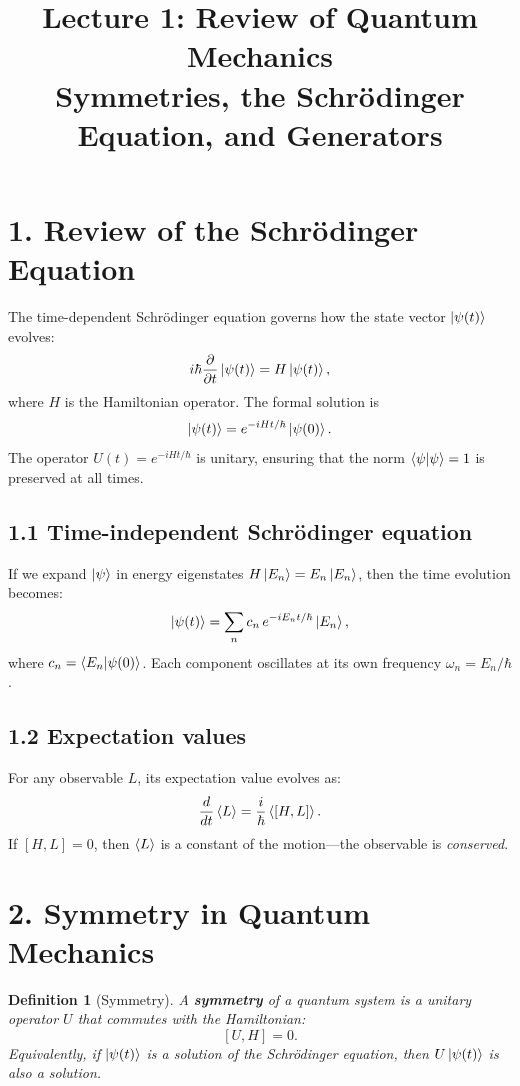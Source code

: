 \documentclass[12pt,a4paper]{article}
\title{\textbf{Lecture 1: Review of Quantum Mechanics} \\ \large Symmetries, the Schr\"odinger Equation, and Generators}
\date{}
\newtheorem{definition}{Definition}
\begin{document}
\maketitle
\thispagestyle{fancy}

\section{1. Review of the Schr\"odinger Equation}

The time-dependent Schr\"odinger equation governs how the state vector $\ket{\psi(t)}$ evolves:
\[
    i\hbar \frac{\partial}{\partial t}\ket{\psi(t)} = H \ket{\psi(t)},
\]
where $H$ is the Hamiltonian operator.  The formal solution is
\[
    \ket{\psi(t)} = e^{-iHt/\hbar}\ket{\psi(0)}.
\]
The operator $U(t) = e^{-iHt/\hbar}$ is unitary, ensuring that the norm $\braket{\psi}{\psi} = 1$ is preserved at all times.

\subsection{1.1 Time-independent Schr\"odinger equation}
If we expand $\ket{\psi}$ in energy eigenstates $H\ket{E_n} = E_n\ket{E_n}$, then the time evolution becomes:
\[
    \ket{\psi(t)} = \sum_n c_n \, e^{-iE_n t/\hbar}\ket{E_n},
\]
where $c_n = \braket{E_n}{\psi(0)}$.  Each component oscillates at its own frequency $\omega_n = E_n/\hbar$.

\subsection{1.2 Expectation values}
For any observable $L$, its expectation value evolves as:
\[
    \frac{d}{dt}\expval{L} = \frac{i}{\hbar}\expval{[H, L]}.
\]
If $[H, L] = 0$, then $\expval{L}$ is a constant of the motion---the observable is \emph{conserved}.

\section{2. Symmetry in Quantum Mechanics}

\begin{definition}[Symmetry]
A \textbf{symmetry} of a quantum system is a unitary operator $U$ that commutes with the Hamiltonian:
\[
    [U, H] = 0.
\]
Equivalently, if $\ket{\psi(t)}$ is a solution of the Schr\"odinger equation, then $U\ket{\psi(t)}$ is also a solution.
\end{definition}
\end{document}
